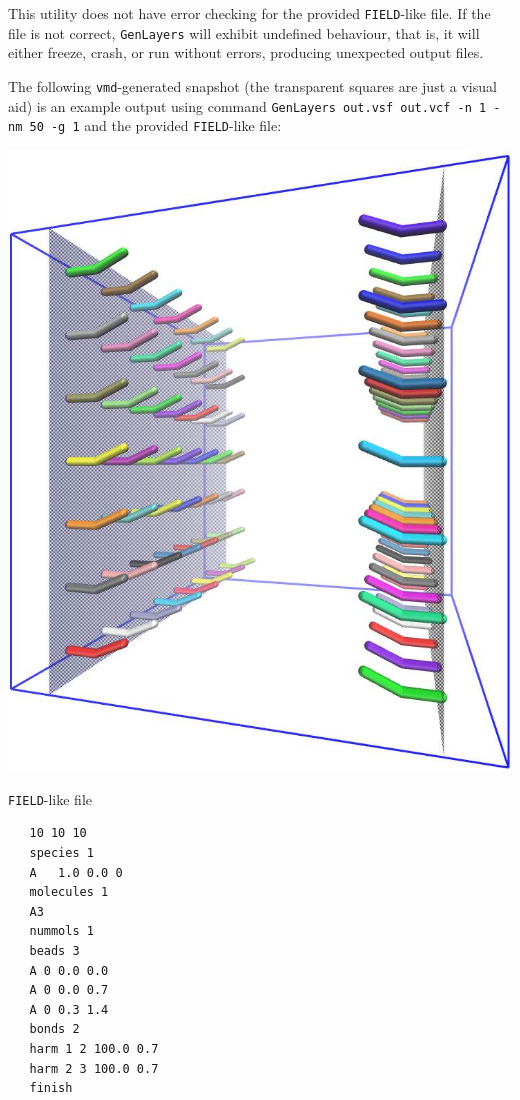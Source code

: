 This utility does not have error checking for the provided
\texttt{FIELD}-like file. If the file is not correct, \texttt{GenLayers}
will exhibit undefined behaviour, that is, it will either freeze, crash, or
run without errors, producing unexpected output files.

The following \texttt{vmd}-generated snapshot (the transparent squares are
just a visual aid) is an example output using command \texttt{GenLayers
out.vsf out.vcf -n 1 -nm 50 -g 1} and the provided \texttt{FIELD}-like
file:

\hfill
\begin{minipage}{0.4\textwidth}

  \includegraphics[width=\textwidth]{GenLayers-478ctac.jpg}
\end{minipage}
\hfill
\begin{minipage}{0.3\textwidth}
  \centering
  \texttt{FIELD}-like file
  \vspace{-1em}

\begin{verbatim}
   10 10 10
   species 1
   A   1.0 0.0 0
   molecules 1
   A3
   nummols 1
   beads 3
   A 0 0.0 0.0
   A 0 0.0 0.7
   A 0 0.3 1.4
   bonds 2
   harm 1 2 100.0 0.7
   harm 2 3 100.0 0.7
   finish
\end{verbatim}
\end{minipage}

